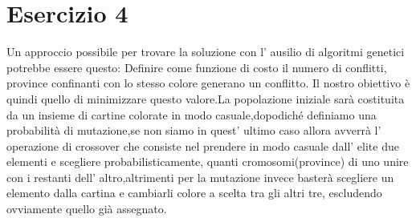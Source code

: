 	\section{Esercizio 4}
		\label{sec:es4}
		Un approccio possibile per trovare la soluzione con l' ausilio di algoritmi genetici potrebbe essere questo:
		Definire come funzione di costo il numero di conflitti, province confinanti con lo stesso colore generano un conflitto. Il nostro obiettivo è quindi quello di minimizzare questo valore.La popolazione iniziale sarà costituita da un insieme di cartine colorate in modo casuale,dopodiché definiamo una probabilità di mutazione,se non siamo in quest' ultimo caso allora avverrà l' operazione di crossover che consiste nel prendere in modo casuale dall' elite due elementi e scegliere probabilisticamente, quanti cromosomi(province) di uno unire con i restanti dell' altro,altrimenti per la mutazione invece basterà scegliere un elemento dalla cartina e cambiarli colore a scelta tra gli altri tre, escludendo ovviamente quello già assegnato. 
		